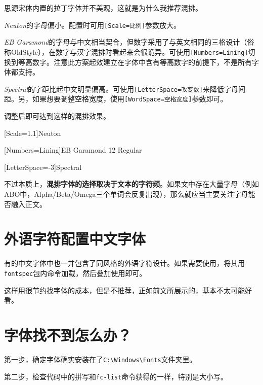\documentclass[10pt,openany]{book}
\begin{document}
思源宋体内置的拉丁字体并不美观，这就是为什么我推荐混排。

\textit{Neuton}的字母偏小。配置时可用\texttt{[Scale=比例]}参数放大。

\textit{EB Garamond}的字母与中文相当契合，但数字采用了与英文相同的三格设计（俗称OldStyle），在数字与汉字混排时看起来会很诡异。可使用\texttt{[Numbers=Lining]}切换到等高数字。注意此方案起效建立在字体中含有等高数字的前提下，不是所有字体都支持。

\textit{Spectral}的字距比起中文明显偏高。可使用\texttt{[LetterSpace=改变数]}来降低字母间距。另，如果想要调整空格宽度，使用\texttt{[WordSpace=空格宽度]}参数即可。

调整后即可达到这样的混排效果。

\begin{adjustwidth}{2em}{2em}
    \blankpar

    [Scale=1.1]Neuton\testtext

    [Numbers=Lining]EB Garamond 12 Regular\testtext

    [LetterSpace=-3]Spectral\testtext

    \blankpar
\end{adjustwidth}

不过本质上，\textbf{混排字体的选择取决于文本的字符频}。如果文中存在大量字母（例如ABO中，Alpha/Beta/Omega三个单词会反复出现），那么就应当主要关注字母能否融入正文。

\section{外语字符配置中文字体}

有的中文字体中也一并包含了同风格的外语字符设计。如果需要使用，将其用\texttt{fontspec}包内命令加载，然后叠加使用即可。



这样用很节约找字体的成本，但是不推荐，正如前文所展示的，基本不太可能好看。

\section{字体找不到怎么办？}

第一步，确定字体确实安装在了\texttt{C:\textbackslash{}Windows\textbackslash{}Fonts}文件夹里。

第二步，检查代码中的拼写和\texttt{fc-list}命令获得的一样，特别是大小写。
\end{document}
